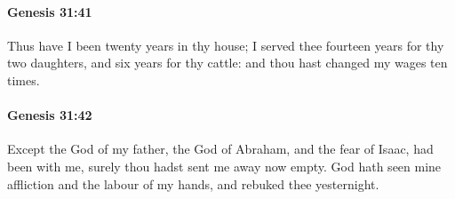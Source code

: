 		\paragraph{Genesis 31:41} %
			\label{GENESIS-31-41}

			Thus have I been twenty years in thy house; I served thee fourteen years for thy two daughters, and six years for thy cattle: and thou hast changed my wages ten times.


		\paragraph{Genesis 31:42} %
			\label{GENESIS-31-42}

			Except the God of my father, the God of Abraham, and the fear of Isaac, had been with me, surely thou hadst sent me away now empty. God hath seen mine affliction and the labour of my hands, and rebuked thee yesternight.

